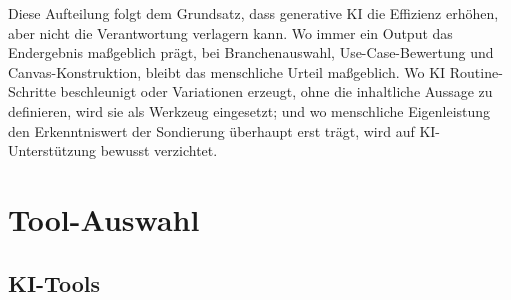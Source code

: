 \documentclass[a4paper,11pt]{article}
\begin{document}
Diese Aufteilung folgt dem Grundsatz, dass generative KI die Effizienz
erhöhen, aber nicht die Verantwortung verlagern kann. Wo immer ein
Output das Endergebnis maßgeblich prägt, bei Branchenauswahl,
Use-Case-Bewertung und Canvas-Konstruktion, bleibt das menschliche
Urteil maßgeblich. Wo KI Routine-Schritte beschleunigt oder Variationen
erzeugt, ohne die inhaltliche Aussage zu definieren, wird sie als
Werkzeug eingesetzt; und wo menschliche Eigenleistung den Erkenntniswert
der Sondierung überhaupt erst trägt, wird auf KI-Unterstützung bewusst
verzichtet.

\section{Tool-Auswahl}


\subsection{KI-Tools}
\end{document}
